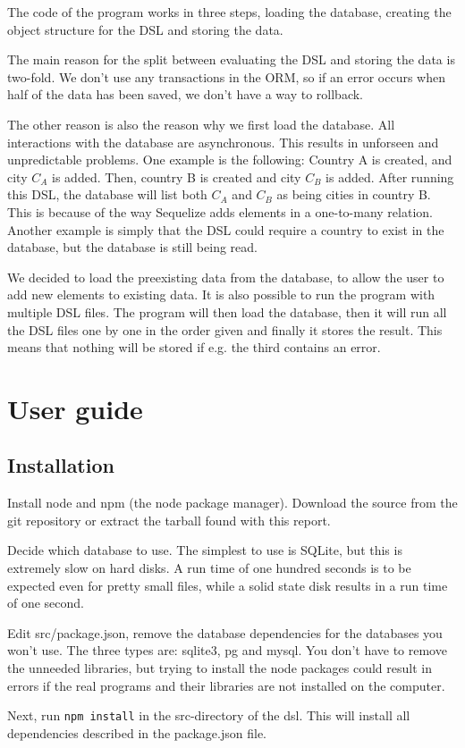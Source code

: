 \documentclass[a4paper,11pt]{article}
\newcommand{\npar}{\par \vspace{2.3ex plus 0.3ex minus 0.3ex} \noindent}
\begin{document}
\npar The code of the program works in three steps, loading the database, creating the object structure for the DSL and storing the data.
\par The main reason for the split between evaluating the DSL and storing the data is two-fold. We don’t use any transactions in the ORM, so if an error occurs when half of the data has been saved, we don’t have a way to rollback.
\par The other reason is also the reason why we first load the database. All interactions with the database are asynchronous. This results in unforseen and unpredictable problems. One example is the following: Country A is created, and city \(C_A\) is added. Then, country B is created and city \(C_B\) is added. After running this DSL, the database will list both \(C_A\) and \(C_B\) as being cities in country B. This is because of the way Sequelize adds elements in a one-to-many relation. Another example is simply that the DSL could require a country to exist in the database, but the database is still being read.

\npar We decided to load the preexisting data from the database, to allow the user to add new elements to existing data. It is also possible to run the program with multiple DSL files. The program will then load the database, then it will run all the DSL files one by one in the order given and finally it stores the result. This means that nothing will be stored if e.g. the third contains an error.

\section{User guide}

\subsection{Installation}
Install node and npm (the node package manager). Download the source from the git repository or extract the tarball found with this report.
\npar Decide which database to use. The simplest to use is SQLite, but this is extremely slow on hard disks. A run time of one hundred seconds is to be expected even for pretty small files, while a solid state disk results in a run time of one second.
\par Edit src/package.json, remove the database dependencies for the databases you won’t use. The three types are: sqlite3, pg and mysql. You don’t have to remove the unneeded libraries, but trying to install the node packages could result in errors if the real programs and their libraries are not installed on the computer.
\npar Next, run \texttt{npm install} in the src-directory of the dsl. This will install all dependencies described in the package.json file.
\end{document}

